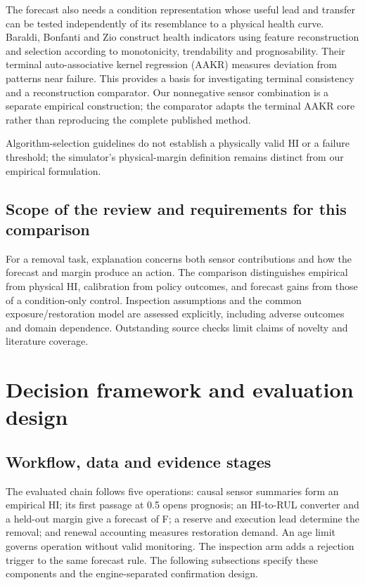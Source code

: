 \documentclass[preprint,12pt]{elsarticle}
\begin{document}
The forecast also needs a condition representation whose useful lead and transfer can be tested independently of its resemblance to a physical health curve. Baraldi, Bonfanti and Zio \cite{Baraldi2018HI} construct health indicators using feature reconstruction and selection according to monotonicity, trendability and prognosability. Their terminal auto-associative kernel regression (AAKR) measures deviation from patterns near failure. This provides a basis for investigating terminal consistency and a reconstruction comparator. Our nonnegative sensor combination is a separate empirical construction; the comparator adapts the terminal AAKR core rather than reproducing the complete published method.

Algorithm-selection guidelines do not establish a physically valid HI or a failure threshold; the simulator's physical-margin definition \cite{Saxena2008} remains distinct from our empirical formulation.



\subsection{Scope of the review and requirements for this comparison}



For a removal task, explanation concerns both sensor contributions and how the forecast and margin produce an action. The comparison distinguishes empirical from physical HI, calibration from policy outcomes, and forecast gains from those of a condition-only control. Inspection assumptions and the common exposure/restoration model are assessed explicitly, including adverse outcomes and domain dependence. Outstanding source checks limit claims of novelty and literature coverage.

\section{Decision framework and evaluation design}\label{sec:method}

\subsection{Workflow, data and evidence stages}\label{sec:workflow}

The evaluated chain follows five operations: causal sensor summaries form an empirical HI; its first passage at 0.5 opens prognosis; an HI-to-RUL converter and a held-out margin give a forecast of F; a reserve and execution lead determine the removal; and renewal accounting measures restoration demand. An age limit governs operation without valid monitoring. The inspection arm adds a rejection trigger to the same forecast rule. The following subsections specify these components and the engine-separated confirmation design.
\end{document}

